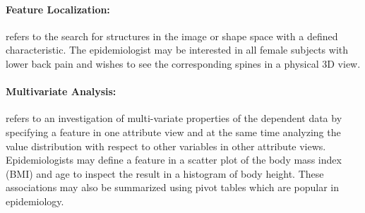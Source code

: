 \documentclass[journal]{style/vgtc} 			          %
\begin{document}
\paragraph{Feature Localization:} refers to the search for structures in the image or shape space with a defined characteristic.
%
The epidemiologist may be interested in all female subjects with lower back pain and wishes to see the corresponding spines in a physical 3D view.

\paragraph{Multivariate Analysis:} refers to an investigation of multi-variate properties of the dependent data by specifying a feature in one attribute view and at the same time analyzing the value distribution with respect to other variables in other attribute views.
%
Epidemiologists may define a feature in a scatter plot of the body mass index (BMI) and age to inspect the result in a histogram of body height.
%
These associations may also be summarized using pivot tables which are popular in epidemiology.
\end{document}
